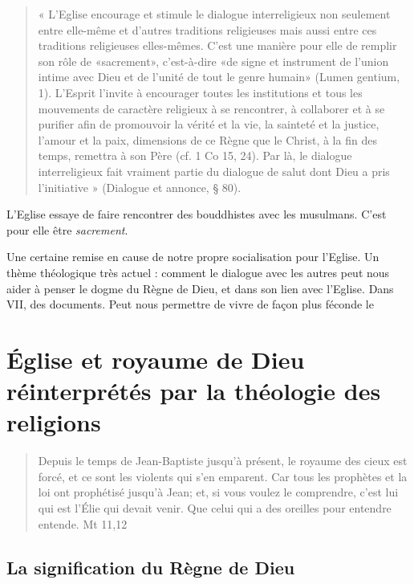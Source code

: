 \begin{quote}
« L’Eglise encourage et stimule le dialogue interreligieux non seulement entre elle-même et d’autres traditions religieuses mais aussi entre ces traditions religieuses elles-mêmes. C’est une manière pour elle de remplir son rôle de «sacrement», c’est-à-dire «de signe et instrument de l’union intime avec Dieu et de l’unité de tout le genre humain» (Lumen gentium, 1). L’Esprit l’invite à encourager toutes les institutions et tous les mouvements de caractère religieux à se rencontrer, à collaborer et à se purifier afin de promouvoir la vérité et la vie, la sainteté et la justice, l’amour et la paix, dimensions de ce Règne que le Christ, à la fin des temps, remettra à son Père (cf. 1 Co 15, 24). Par là, le dialogue interreligieux fait vraiment partie du dialogue de salut dont Dieu a pris l’initiative » (Dialogue et annonce, § 80). 
\end{quote}
L'Eglise essaye de faire rencontrer des bouddhistes avec les musulmans. C'est pour elle être \textit{sacrement}. 


Une certaine remise en cause de notre propre socialisation pour l'Eglise. 
Un thème théologique très actuel : comment le dialogue avec les autres peut nous aider à penser le dogme du Règne de Dieu, et dans son lien avec l'Eglise.
Dans VII, des documents.
Peut nous permettre de vivre de façon plus féconde le
  
  
  
\section{Église et royaume de Dieu réinterprétés par la théologie des religions}
  
  
  \begin{quote}
      Depuis le temps de Jean-Baptiste jusqu’à présent, le royaume des cieux est forcé, et ce sont les violents qui s’en emparent. Car tous les prophètes et la loi ont prophétisé jusqu’à Jean; et, si vous voulez le comprendre, c’est lui qui est l’Élie qui devait venir. Que celui qui a des oreilles pour entendre entende. Mt 11,12
  \end{quote}
  
\subsection{La signification du Règne de Dieu}

